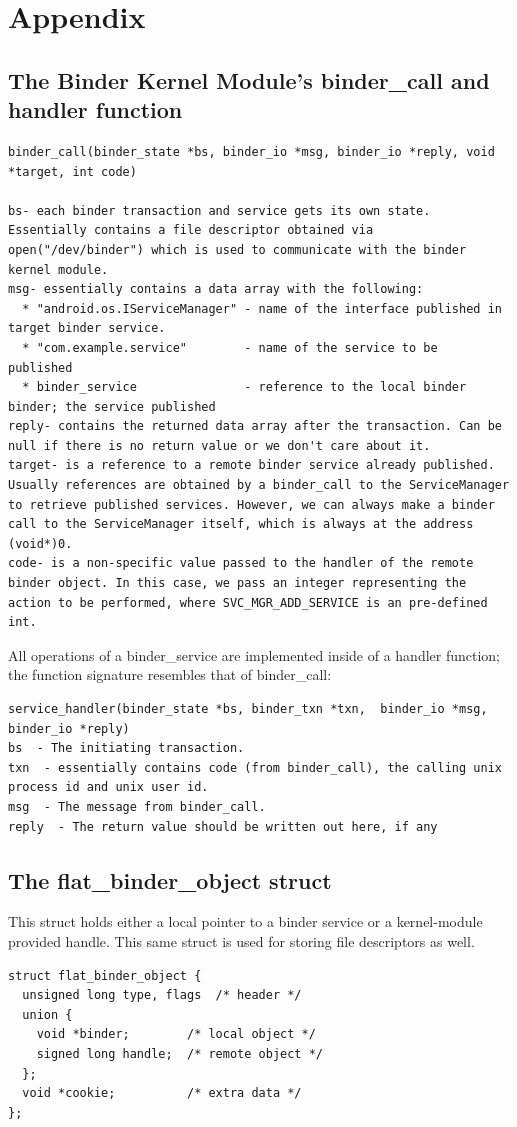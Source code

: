 \documentclass[prodmode]{acmlarge}
\begin{document}


\section{Appendix}

\subsection{The Binder Kernel Module's binder\_call and handler function}
\begin{Verbatim}[samepage=true]
binder_call(binder_state *bs, binder_io *msg, binder_io *reply, void *target, int code)

bs- each binder transaction and service gets its own state. Essentially contains a file descriptor obtained via open("/dev/binder") which is used to communicate with the binder kernel module.
msg- essentially contains a data array with the following:
  * "android.os.IServiceManager" - name of the interface published in target binder service.
  * "com.example.service"        - name of the service to be  published
  * binder_service               - reference to the local binder binder; the service published
reply- contains the returned data array after the transaction. Can be null if there is no return value or we don't care about it.
target- is a reference to a remote binder service already published. Usually references are obtained by a binder_call to the ServiceManager to retrieve published services. However, we can always make a binder call to the ServiceManager itself, which is always at the address (void*)0.
code- is a non-specific value passed to the handler of the remote binder object. In this case, we pass an integer representing the action to be performed, where SVC_MGR_ADD_SERVICE is an pre-defined int.
\end{Verbatim}

All operations of a binder\_service are implemented inside of a handler function; the function signature resembles that of binder\_call:
\begin{Verbatim}[samepage=true]
service_handler(binder_state *bs, binder_txn *txn,  binder_io *msg,  binder_io *reply)
bs  - The initiating transaction.
txn  - essentially contains code (from binder_call), the calling unix process id and unix user id.
msg  - The message from binder_call.
reply  - The return value should be written out here, if any
\end{Verbatim}

\subsection{The flat\_binder\_object struct}
This struct holds either a local pointer to a binder service or a kernel-module provided handle. This same struct is used for storing file descriptors as well.
\begin{Verbatim}[samepage=true]
struct flat_binder_object {
  unsigned long type, flags  /* header */
  union {
    void *binder;        /* local object */
    signed long handle;  /* remote object */
  };
  void *cookie;          /* extra data */
};
\end{Verbatim}
\end{document}
